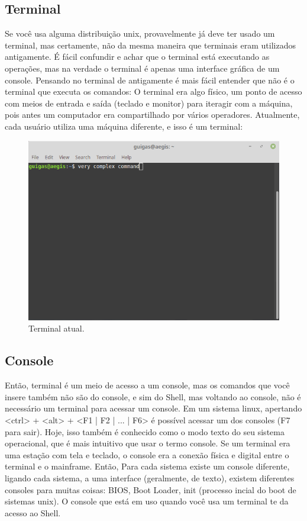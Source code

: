 \documentclass[twoside,twocolumn]{article}
\begin{document}
\subsection{Terminal}
Se você usa alguma distribuição unix, provavelmente já deve ter usado um terminal, mas certamente, não da mesma maneira que terminais eram utilizados antigamente. É fácil confundir e achar que o terminal está executando as operações, mas na verdade o terminal é apenas uma interface gráfica de um console. Pensando no terminal de antigamente é mais fácil entender que não é o terminal que executa os comandos: O terminal era algo físico, um ponto de acesso com meios de entrada e saída (teclado e monitor) para iteragir com a máquina, pois antes um computador era compartilhado por vários operadores.
Atualmente, cada usuário utiliza uma máquina diferente, e isso é um terminal:
\begin{figure}[h]
	\includegraphics[width=\linewidth]{term2.png}
	\caption{Terminal atual.}
	\label{fig:term1}
\end{figure}
\subsection{Console}
Então, terminal é um meio de acesso a um console, mas os comandos que você insere também não são do console, e sim do Shell, mas voltando ao console, não é necessário um terminal para acessar um console. Em um sistema linux, apertando <ctrl> + <alt> + <F1 | F2 | ... | F6> é possível acessar um dos consoles (F7 para sair). Hoje, isso também é conhecido como o modo texto do seu sistema operacional, que é mais intuitivo que usar o termo console. Se um terminal era uma estação com tela e teclado, o console era a conexão física e digital entre o terminal e o mainframe. Então, Para cada sistema existe um console diferente, ligando cada sistema, a uma interface (geralmente, de texto), existem diferentes consoles para muitas coisas: BIOS, Boot Loader, init (processo incial do boot de sistemas unix). O console que está em uso quando você usa um terminal te da acesso ao Shell.
\end{document}
